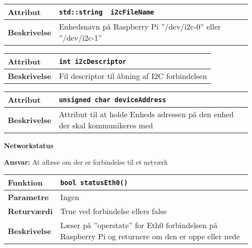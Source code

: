 \begin{center}
    \begin{tabular}{ | l | p{} |}
    \hline
    \textbf{Attribut}		& \verb+std::string  i2cFileName +								\\ \hline
    \textbf{Beskrivelse} 	& Enhedsnavn på Raspberry Pi ''/dev/i2c-0'' eller ''/dev/i2c-1''	\\ \hline
    \end{tabular}
\end{center}

\begin{center}
    \begin{tabular}{ | l | p{} |}
    \hline
    \textbf{Attribut}		& \verb+int i2cDescriptor +										\\ \hline
    \textbf{Beskrivelse} 	& Fil descriptor til åbning af I2C forbindelsen					\\ \hline
    \end{tabular}
\end{center}

\begin{center}
    \begin{tabular}{ | l | p{} |}
    \hline
    \textbf{Attribut}		& \verb+unsigned char deviceAddress + 								\\ \hline
    \textbf{Beskrivelse} 	& Attribut til at holde Enheds adressen på den enhed der skal kommunikeres med					\\ \hline
    \end{tabular}
\end{center}



{\centering
\textbf{Networkstatus}\par
}
\textbf{Ansvar:} At aflæse om der er forbindelse til et netværk \

\begin{center}
    \begin{tabular}{ | l | p{} |}
    \hline
    \textbf{Funktion}	& \verb+bool statusEth0() +												\\ \hline
    \textbf{Parametre} 	& Ingen																	\\ \hline
    \textbf{Returværdi}	& True ved forbindelse ellers false										\\ \hline
    \textbf{Beskrivelse}	& Læser på ''operstate'' for Eth0 forbindelsen på Raspberry Pi og returnere om den er oppe eller nede						\\ \hline
    \end{tabular}
\end{center}

